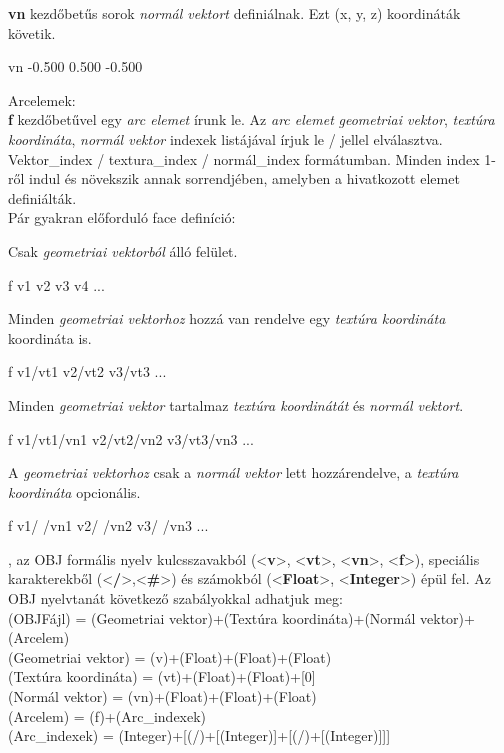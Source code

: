 \noindent \textbf{vn} kezdőbetűs sorok \textsl{normál vektort} definiálnak. Ezt  (x, y, z) koordináták követik.
\bigskip
\begin{python} 
vn -0.500 0.500 -0.500
\end{python}
\bigskip
Arcelemek:\\

\noindent \textbf{f} kezdőbetűvel egy \textsl{arc elemet} írunk le. Az \textsl{arc elemet} \textsl{geometriai vektor}, \textsl{textúra koordináta}, \textsl{normál vektor} indexek listájával írjuk le {/} jellel elválasztva. Vektor{\_}index {/} textura{\_}index {/}  normál{\_}index formátumban. Minden index 1-ről indul és növekszik annak sorrendjében, amelyben a hivatkozott elemet definiálták.\\

\noindent Pár gyakran előforduló face definíció:\newline

\noindent Csak \textsl{geometriai vektorból} álló felület.
\bigskip
\begin{python} 
f v1 v2 v3 v4 ...
\end{python}
\bigskip
 Minden \textsl{geometriai vektorhoz} hozzá van rendelve egy \textsl{textúra koordináta} koordináta is.
\begin{python} 
f v1/vt1 v2/vt2 v3/vt3 ...
\end{python}
\bigskip
Minden \textsl{geometriai vektor} tartalmaz \textsl{textúra koordinátát} és \textsl{normál vektort}.
\begin{python} 
f v1/vt1/vn1 v2/vt2/vn2 v3/vt3/vn3 ...
\end{python}
\bigskip
A \textsl{geometriai vektorhoz} csak a \textsl{normál vektor} lett hozzárendelve, a \textsl{textúra koordináta} opcionális.
\begin{python} 
f v1/ /vn1 v2/ /vn2 v3/ /vn3 ...
\end{python}
\newpage
{}, az OBJ formális nyelv kulcsszavakból (<\textbf{v}>, <\textbf{vt}>, <\textbf{vn}>, <\textbf{f}>), speciális karakterekből (<\textbf{/}>,<\textbf{\#}>) és számokból (<\textbf{Float}>, <\textbf{Integer}>) épül fel. Az OBJ nyelvtanát következő szabályokkal adhatjuk meg:\\

\noindent(OBJFájl) = {(Geometriai vektor)}+{(Textúra koordináta)}+{(Normál vektor)}+{(Arcelem)}\\
(Geometriai vektor) = (v)+(Float)+(Float)+(Float)\\
(Textúra koordináta) = (vt)+(Float)+(Float)+[0]\\
(Normál vektor) = (vn)+(Float)+(Float)+(Float)\\
(Arcelem) = (f)+{(Arc{\_}indexek)}\\
(Arc{\_}indexek) = (Integer)+[(/)+[(Integer)]+[(/)+[(Integer)]]]\\

